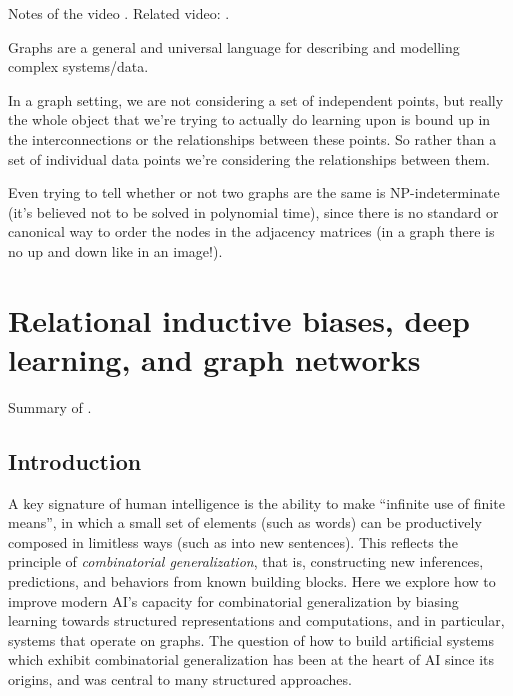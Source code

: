\documentclass[10pt]{book}
\let\defaultmarginpar\marginpar
\renewcommand\marginpar[2][]{\defaultmarginpar{\itshape\color{gray}#2}}
\begin{document}
Notes of the video \cite{HamiltonGRLVideo}. Related video: \cite{PetarTF-GNN}.

Graphs are a general and universal language for describing and modelling complex systems/data.

In a graph setting, we are not considering a set of independent points, but really the whole object that we're trying to actually do learning upon is bound up in the interconnections or the relationships between these points. So rather than a set of individual data points we're considering the relationships between them.

Even trying to tell whether or not two graphs are the same is NP-indeterminate (it's believed not to be solved in polynomial time), since there is no standard or canonical way to order the nodes in the adjacency matrices (in a graph there is no up and down like in an image!).




\chapter{Relational inductive biases, deep learning, and graph networks}

Summary of \cite{battaglia2018relational}.

\section{Introduction}

A key signature of human intelligence is the ability to make ``infinite use of finite means'', in which a small set of elements (such as words) can be productively composed in limitless ways (such as into new sentences). This reflects the principle of \emph{combinatorial generalization}\marginpar{combinatorial generalization}, that is, constructing new inferences, predictions, and behaviors from known building blocks. Here we explore how to improve modern AI's capacity for combinatorial generalization by biasing learning towards structured representations and computations, and in particular, systems that operate on graphs. The question of how to build artificial systems which exhibit combinatorial generalization has been at the heart of AI since its origins, and was central to many structured approaches.
\end{document}
